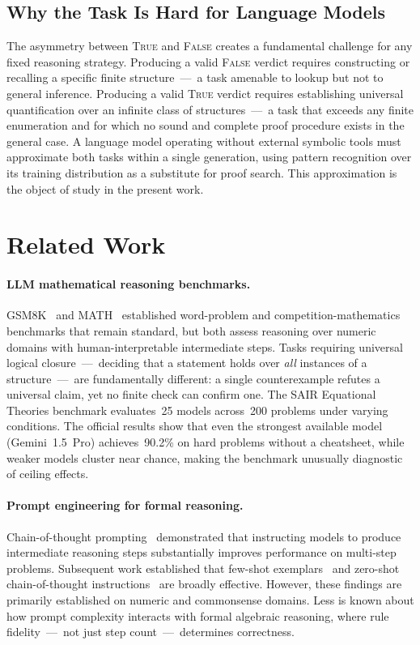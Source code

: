 \documentclass[11pt]{article}
\begin{document}
\subsection{Why the Task Is Hard for Language Models}

The asymmetry between \textsc{True} and \textsc{False} creates a
fundamental challenge for any fixed reasoning strategy. Producing a
valid \textsc{False} verdict requires constructing or recalling a
specific finite structure~---~a task amenable to lookup but not to
general inference. Producing a valid \textsc{True} verdict requires
establishing universal quantification over an infinite class of
structures~---~a task that exceeds any finite enumeration and for which
no sound and complete proof procedure exists in the general case. A
language model operating without external symbolic tools must
approximate both tasks within a single generation, using pattern
recognition over its training distribution as a substitute for proof
search. This approximation is the object of study in the present work.

\section{Related Work}
\label{sec:related}

\paragraph{LLM mathematical reasoning benchmarks.}
GSM8K~\citep{cobbe2021gsm8k} and MATH~\citep{hendrycks2021math}
established word-problem and competition-mathematics benchmarks that
remain standard, but both assess reasoning over numeric domains with
human-interpretable intermediate steps. Tasks requiring universal
logical closure~---~deciding that a statement holds over \emph{all}
instances of a structure~---~are fundamentally different: a single
counterexample refutes a universal claim, yet no finite check can
confirm one. The SAIR Equational Theories benchmark evaluates~25 models
across~200 problems under varying conditions. The official results show
that even the strongest available model (Gemini~1.5~Pro) achieves~90.2\%
on hard problems without a cheatsheet, while weaker models cluster near
chance, making the benchmark unusually diagnostic of ceiling effects.

\paragraph{Prompt engineering for formal reasoning.}
Chain-of-thought prompting~\citep{wei2022cot} demonstrated that
instructing models to produce intermediate reasoning steps substantially
improves performance on multi-step problems. Subsequent work established
that few-shot exemplars~\citep{brown2020gpt3} and zero-shot
chain-of-thought instructions~\citep{kojima2022zeroshot} are broadly
effective. However, these findings are primarily established on numeric
and commonsense domains. Less is known about how prompt complexity
interacts with formal algebraic reasoning, where rule fidelity~---~not
just step count~---~determines correctness.
\end{document}
